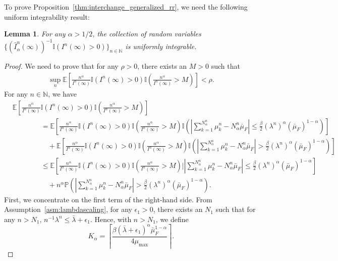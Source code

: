 \documentclass[a4paper,11pt,twoside]{article}
\numberwithin{equation}{section}
\numberwithin{figure}{section}
\theoremstyle{plain}
\newtheorem{lemma}[theorem]{Lemma}
\newcommand{\EE}{\mathbb{E}}
\newcommand{\II}{\mathbb{I}}
\newcommand{\NN}{\mathbb{N}}
\newcommand{\PP}{\mathbb{P}}
\newcommand{\1}{\mathbbm{1}}
\begin{document}
To prove Proposition~\ref{thm:interchange_generalized_rr}, we need the following uniform integrability result:
\begin{lemma}\label{lem:uniform_integrable_inverse}
For any $\alpha>1/2$, the collection of random variables $\{(\hat{I}_\alpha^n(\infty))^{-1}\II(I^n(\infty)>0)\}_{n\in \NN}$ is uniformly integrable. 
\end{lemma}
\begin{proof}
We need to prove that for any $\rho>0$, there exists an $M>0$ such that 
\begin{align}
\sup_n \EE\left[\frac{n^{\alpha}}{I^n(\infty)}\II(I^n(\infty)>0)\II\left(\frac{n^{\alpha}}{I^n(\infty)}>M\right)\right]<\rho.
\label{eq:uniform_integrability_def}
\end{align}
For any $n\in \NN$, we have 
\begin{align}
    \nonumber&\EE\left[\frac{n^{\alpha}}{I^n(\infty)}\II(I^n(\infty)>0)\II\left(\frac{n^{\alpha}}{I^n(\infty)}>M\right)\right]\\
    \nonumber&\qquad\qquad=\EE\left[\frac{n^{\alpha}}{I^n(\infty)}\II(I^n(\infty)>0)\II\left(\frac{n^{\alpha}}{I^n(\infty)}>M\right)\II\left(\left|\sum_{k=1}^{N^n_\alpha}\mu_k^n-N^n_\alpha\bar{\mu}_F\right|\leq \frac{\beta}{2}(\lambda^n)^\alpha(\bar{\mu}_F)^{1-\alpha}\right)\right]\\
    \nonumber&\qquad\qquad\quad + \EE\left[\frac{n^{\alpha}}{I^n(\infty)}\II(I^n(\infty)>0)\II\left(\frac{n^{\alpha}}{I^n(\infty)}>M\right)\II\left(\left|\sum_{k=1}^{N^n_\alpha}\mu_k^n-N^n_\alpha\bar{\mu}_F\right|> \frac{\beta}{2}(\lambda^n)^\alpha(\bar{\mu}_F)^{1-\alpha}\right)\right]\\
    \nonumber&\qquad\qquad\leq \EE\left[\frac{n^{\alpha}}{I^n(\infty)}\II(I^n(\infty)>0)\II\left(\frac{n^{\alpha}}{I^n(\infty)}>M\right)|\left|\sum_{k=1}^{N^n_\alpha}\mu_k^n-N^n_\alpha\bar{\mu}_F\right|\leq \frac{\beta}{2}(\lambda^n)^\alpha(\bar{\mu}_F)^{1-\alpha}\right]
    \\&\qquad\qquad\quad + n^{\alpha}\PP\left(\left|\sum_{k=1}^{N^n_\alpha}\mu_k^n-N^n_\alpha\bar{\mu}_F\right|> \frac{\beta}{2}(\lambda^n)^\alpha(\bar{\mu}_F)^{1-\alpha}\right).
    \label{eq:bound_uniform_integrability_I}
\end{align}
First, we concentrate on the first term of the right-hand side. From Assumption~\ref{asm:lambdascaling}, for any $\epsilon_1>0$, there exists an $N_1$ such that for any $n>N_1$, $n^{-1}\lambda^n\leq \bar{\lambda}+\epsilon_1$. Hence, with  $n>N_1$, we define 
\[
K_\alpha=\left\lceil \frac{\beta(\bar{\lambda}+\epsilon_1)^\alpha\bar{\mu}_F^{1-\alpha}}{4\mu_{\max}} \right\rceil. 
\]
\end{proof}
\end{document}
